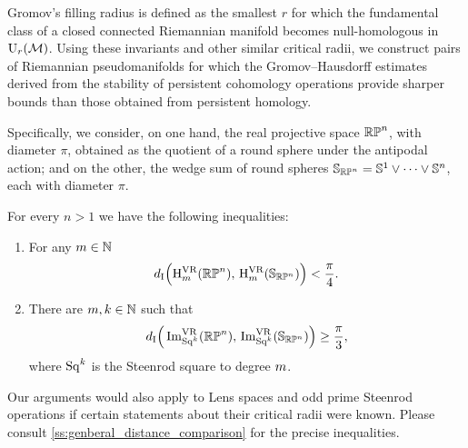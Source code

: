 Gromov's filling radius is defined as the smallest \(r\) for which the fundamental class of a closed connected Riemannian manifold becomes null-homologous in \(\mathrm{U}_r(\mathcal{M})\).
Using these invariants and other similar critical radii, we construct pairs of Riemannian pseudomanifolds for which the Gromov--Hausdorff estimates derived from the stability of persistent cohomology operations provide sharper bounds than those obtained from persistent homology.



Specifically, we consider, on one hand, the real projective space \(\mathbb{RP}^n\), with diameter \(\pi\), obtained as the quotient of a round sphere under the antipodal action; and on the other, the wedge sum of round spheres \(\mathbb{S}_{\mathbb{RP}^n} = \mathbb{S}^1 \vee \dots \vee \mathbb{S}^n\), each with diameter \(\pi\).

\medskip\theorem
For every \(n > 1\) we have the following inequalities:
\begin{enumerate}
	\item For any \(m \in \mathbb{N}\)
	\[
	d_{\mathrm{I}}\Big(\mathrm{H}^{\mathrm{VR}}_m(\mathbb{RP}^n),\, \mathrm{H}^{\mathrm{VR}}_m(\mathbb{S}_{\mathbb{RP}^n})\Big) < \frac{\pi}{4}.
	\]

	\item There are \(m, k \in \mathbb{N}\) such that
	\[
	d_{\mathrm{I}}\Big(\operatorname{Im}_{\mathrm{Sq}^k}^{\mathrm{VR}}(\mathbb{RP}^n),\, \operatorname{Im}_{\mathrm{Sq}^k}^{\mathrm{VR}}(\mathbb{S}_{\mathbb{RP}^n})\Big) \geq \frac{\pi}{3},
	\]
	where \(\mathrm{Sq}^k\) is the Steenrod square to degree \(m\).
\end{enumerate}

\medskip Our arguments would also apply to Lens spaces and odd prime Steenrod operations if certain statements about their critical radii were known.
Please consult \cref{ss:genberal_distance_comparison} for the precise inequalities.

